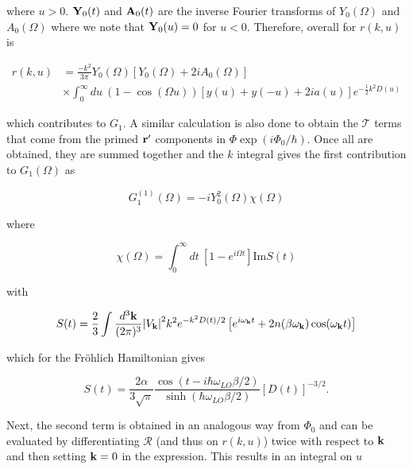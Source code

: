 where $u > 0$. $\vb{Y}_0(t)$ and $\vb{A}_0(t)$ are the inverse Fourier transforms of $Y_0(\Omega)$ and $A_0(\Omega)$ where we note that $\vb{Y}_0(u) = 0$ for $u < 0$. Therefore, overall for $r(k, u)$ is 

\begin{equation}
    \begin{aligned}
        r(k, u) &= \frac{-k^2}{3\pi} Y_0(\Omega) \left[ Y_0(\Omega) + 2i A_0(\Omega) \right] \\
        &\times \int^\infty_0 du\ (1 - \cos(\Omega u)) \left[ y(u) + y(-u) + 2ia(u) \right] e^{-\frac{1}{2}k^2D(u)}
    \end{aligned}
\end{equation}

which contributes to $G_1$. A similar calculation is also done to obtain the $\mathcal{T}$ terms that come from the primed $\vb{r'}$ components in $\Phi \exp(i \Phi_0 / \hbar)$. Once all are obtained, they are summed together and the $k$ integral gives the first contribution to $G_1(\Omega)$ as

\begin{equation}
    G^{(1)}_1(\Omega) = -iY_0^2(\Omega) \chi(\Omega)
\end{equation}

where

\begin{equation}\label{eqn:fhip_chi}
    \chi(\Omega) = \int_0^\infty dt\ \left[ 1 - e^{i \Omega t} \right] \text{Im} S(t)
\end{equation}

with

\begin{equation}\label{eqn:S}
    \begin{aligned}
        S(t) = \frac{2}{3} \int \frac{d^3\vb{k}}{(2\pi)^3} \abs{V_{\vb{k}}}^2 k^2 e^{-k^2 D(t) / 2} \left[ e^{i\omega_{\vb{k}}t} + 2n(\beta\omega_{\vb{k}}) \cos(\omega_{\vb{k}}t) \right]
    \end{aligned}
\end{equation}

which for the Fr\"ohlich Hamiltonian gives

\begin{equation}\label{eqn:dynamic_structure}
    S(t) =  \frac{2\alpha}{3\sqrt{\pi}} \frac{\cos\left(t - i\hbar\omega_{LO}\beta/2\right)}{\sinh\left(\hbar\omega_{LO} \beta / 2 \right)} \left[D(t)\right]^{-3/2}.
\end{equation}

Next, the second term is obtained in an analogous way from $\Phi_0$ and can be evaluated by differentiating $\mathcal{R}$ (and thus on $r(k, u)$) twice with respect to $\vb{k}$ and then setting $\vb{k} = 0$ in the expression. This results in an integral on $u$


